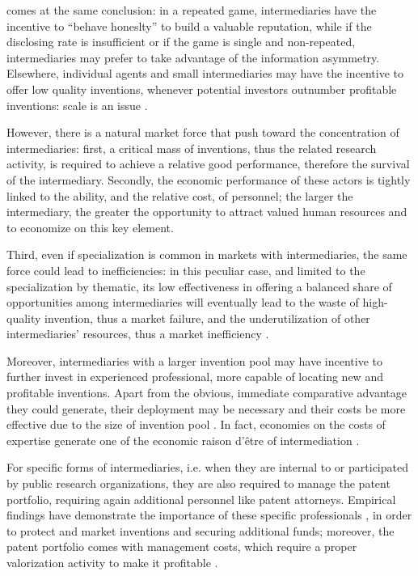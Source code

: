 \citet{Macho-Stadler2007} comes at the same conclusion: in a repeated game, intermediaries have the incentive to \enquote{behave honeslty} to build a valuable reputation, while if the disclosing rate is insufficient or if the game is single and non-repeated, intermediaries may prefer to take advantage of the information asymmetry. Elsewhere, individual agents and small intermediaries may have the incentive to offer low quality inventions, whenever potential investors outnumber profitable inventions: scale is an issue \citep{Hoppe2005, Macho-Stadler2007}. 

However, there is a natural market force that push toward the concentration of intermediaries: first, a critical mass of inventions, thus the related research activity, is required to achieve a relative good performance, therefore the survival of the intermediary. Secondly, the economic performance of these actors is tightly linked to the ability, and the relative cost, of personnel; the larger the intermediary, the greater the opportunity to attract valued human resources and to economize on this key element.

Third, even if specialization is common in markets with intermediaries, the same force could lead to inefficiencies: in this peculiar case, and limited to the specialization by thematic, its low effectiveness in offering a balanced share of opportunities among intermediaries will eventually lead to the waste of high-quality invention, thus a market failure, and the underutilization of other intermediaries' resources, thus a market inefficiency \citep{Hoppe2005}.

Moreover, intermediaries with a larger invention pool may have incentive to further invest in experienced professional, more capable of locating new and profitable inventions. Apart from the obvious, immediate comparative advantage they could generate, their deployment may be necessary and their costs be more effective due to the size of invention pool \citep{Debackere2005}. In fact, economies on the costs of expertise generate one of the economic raison d'être of intermediation \citep{Hoppe2005}.

For specific forms of intermediaries, i.e. when they are internal to or participated by public research organizations, they are also required to manage the patent portfolio, requiring again additional personnel like patent attorneys. Empirical findings have demonstrate the importance of these specific professionals \citep{Siegel2003a}, in order to protect and market inventions and securing additional funds; moreover, the patent portfolio comes with management costs, which require a proper valorization activity to make it profitable \citep{Balderi2010}.

